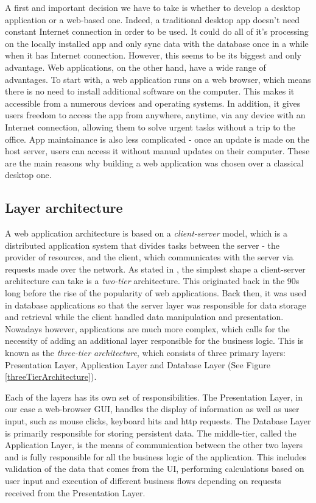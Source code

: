 A first and important decision we have to take is whether to develop a desktop application or a web-based one. Indeed, a traditional desktop app doesn't need constant Internet connection in order to be used. It could do all of it's processing on the locally installed app and only sync data with the database once in a while when it has Internet connection. However, this seems to be its biggest and only advantage. Web applications, on the other hand, have a wide range of advantages. To start with, a web application runs on a web browser, which means there is no need to install additional software on the computer. This makes it accessible from a numerous devices and operating systems. In addition, it gives users freedom to access the app from anywhere, anytime, via any device with an Internet connection, allowing them to solve urgent tasks without a trip to the office. App maintainance is also less complicated - once an update is made on the host server, users can access it without manual updates on their computer. These are the main reasons why building a web application was chosen over a classical desktop one.


\subsection{Layer architecture}
\label{subsection:layerArchitecture}

A web application architecture is based on a \textit{client-server} model, which is a distributed application system that divides tasks between the server - the provider of resources, and the client, which communicates with the server via requests made over the network. As stated in \cite{databaseProgrammingWithJdbcAndJava}, the simplest shape a client-server architecture can take is a \textit{two-tier} architecture. This originated back in the 90s long before the rise of the popularity of web applications. Back then, it was used in database applications so that the server layer was responsible for data storage and retrieval while the client handled data manipulation and presentation. Nowadays however, applications are much more complex, which calls for the necessity of adding an additional layer responsible for the business logic. This is known as the \textit{three-tier architecture}, which consists of three primary layers: Presentation Layer, Application Layer and Database Layer (See Figure \ref{threeTierArchitecture}).

Each of the layers has its own set of responsibilities. The Presentation Layer, in our case a web-browser GUI, handles the display of information as well as user input, such as mouse clicks, keyboard hits and http requests. The Database Layer is primarily responsible for storing persistent data. The middle-tier, called the Application Layer, is the means of communication between the other two layers and is fully responsible for all the business logic of the application. This includes validation of the data that comes from the UI, performing calculations based on user input and execution of different business flows depending on requests received from the Presentation Layer.

